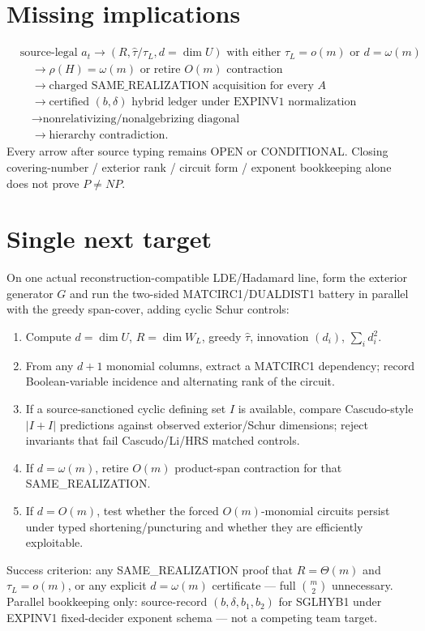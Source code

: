 \documentclass[11pt]{article}
\begin{document}
\section*{Missing implications}
\[
\begin{aligned}
&\text{source-legal }a_t
\to (R,\widehat\tau/\tau_L,d=\dim U)\text{ with either }\tau_L=o(m)\text{ or }d=\omega(m)\\
&\quad\to\rho(H)=\omega(m)\text{ or retire }O(m)\text{ contraction}\\
&\quad\to\text{charged SAME\_REALIZATION acquisition for every }A\\
&\quad\to\text{certified }(b,\delta)\text{ hybrid ledger under EXPINV1 normalization}\\
&\quad\to\text{nonrelativizing/nonalgebrizing diagonal}\\
&\quad\to\text{hierarchy contradiction}.
\end{aligned}
\]
Every arrow after source typing remains OPEN or CONDITIONAL. Closing covering-number / exterior
rank / circuit form / exponent bookkeeping alone does not prove $P\neq NP$.

\section*{Single next target}
On one actual reconstruction-compatible LDE/Hadamard line, form the exterior generator $G$ and
run the two-sided MATCIRC1/DUALDIST1 battery in parallel with the greedy span-cover, adding
cyclic Schur controls:
\begin{enumerate}
\item Compute $d=\dim U$, $R=\dim W_L$, greedy $\widehat\tau$, innovation $(d_i)$, $\sum_i d_i^2$.
\item From any $d+1$ monomial columns, extract a MATCIRC1 dependency; record Boolean-variable
incidence and alternating rank of the circuit.
\item If a source-sanctioned cyclic defining set $I$ is available, compare Cascudo-style
$|I+I|$ predictions against observed exterior/Schur dimensions; reject invariants that
fail Cascudo/Li/HRS matched controls.
\item If $d=\omega(m)$, retire $O(m)$ product-span contraction for that SAME\_REALIZATION.
\item If $d=O(m)$, test whether the forced $O(m)$-monomial circuits persist under typed
shortening/puncturing and whether they are efficiently exploitable.
\end{enumerate}
Success criterion: any SAME\_REALIZATION proof that $R=\Theta(m)$ and $\tau_L=o(m)$, or any
explicit $d=\omega(m)$ certificate --- full $\binom{m}{2}$ unnecessary.
Parallel bookkeeping only: source-record $(b,\delta,b_1,b_2)$ for SGLHYB1 under EXPINV1
fixed-decider exponent schema --- not a competing team target.
\end{document}
